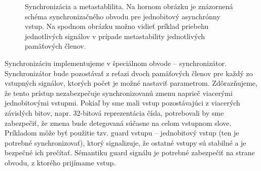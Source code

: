 \begin{figure}
    \centering
    \vfill
    \caption[Synchronizácia a metastablilita]{Synchronizácia a metastablilita. Na hornom obrázku je znázornená schéma synchronizačného obvodu pre jednobitový asynchrónny vstup. Na spodnom obrázku možno vidieť príklad priebehu jednotlivých signálov v prípade metastability jednotlivých pamäťových členov.}
    \label{obr:synchronizer}
\end{figure}

Synchronizáciu implementujeme v špeciálnom obvode -- synchronizátor. Synchronizátor bude pozostávať z reťazi dvoch pamäťových členov pre každý zo vstupných signálov, ktorých počet je možné nastaviť parametrom. Zdôrazňujeme, že tento prístup nezabezpečuje synchronizovanú zmenu naprieč viacerými jednobitovými vstupmi. Pokiaľ by sme mali vstup pozostávajúci z viacerých závislých bitov, napr. 32-bitová reprezentácia čísla, potrebovali by sme zabezpečiť, že zmena bude detegovaná súčasne na celom vstupnom slove. Príkladom môže byť použitie tzv. guard vstupu -- jednobitový vstup (ten je potrebné synchronizovať), ktorý signalizuje, že ostatné vstupy sú stabilné a je bezpečné ich prečítať. Sémantiku guard signálu je potrebné zabezpečiť na strane obvodu, z ktorého prijímame vstup.

